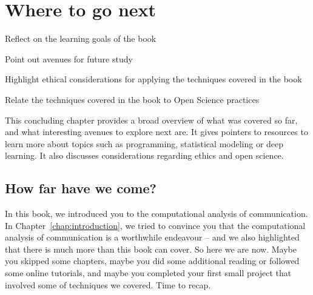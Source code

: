 \chapter{Where to go next}
\label{chap:wherenext}

\begin{abstract}{Abstract}
This chapter summarizes the main learning goals of the book, and outlines possible next steps. Special attention is payed to an ethical application of computational methods, as well as to the importance of open and transparent science.
\end{abstract}



\begin{objectives}
\item Reflect on the learning goals of the book
\item Point out avenues for future study
\item Highlight ethical considerations for applying the techniques covered in the book
\item Relate the techniques covered in the book to Open Science practices
\end{objectives}

\begin{feature}
This concluding chapter provides a broad overview of what was covered so far, and what interesting avenues to explore next are. It gives pointers to resources to learn more about topics such as programming, statistical modeling or deep learning. It also discusses considerations regarding ethics and open science.

\end{feature}



\section{How far have we come?}
In this book, we introduced you to the computational analysis of communication. In Chapter~\ref{chap:introduction}, we tried to convince you that the computational analysis of communication is a worthwhile endeavour -- and we also highlighted that there is much more than this book can cover.
So here we are now. Maybe you skipped some chapters, maybe you did some additional reading or followed some online tutorials, and maybe you completed your first small project that involved some of techniques we covered. Time to recap.

